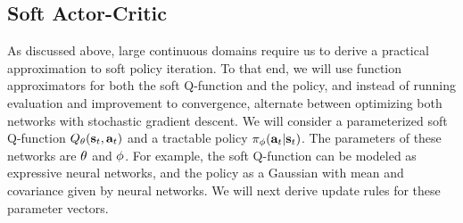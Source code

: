 \subsection{Soft Actor-Critic}
As discussed above, large continuous domains require us to derive a practical approximation to soft policy iteration. To that end, we will use function approximators for both the soft Q-function and the policy, and instead of running evaluation and improvement to convergence, alternate between optimizing both networks with stochastic gradient descent.
We will consider a parameterized soft Q-function $Q_\theta({\mathbf{s}_t}, {\mathbf{a}_t})$ and a tractable policy $\pi_{\phi}({\mathbf{a}_t}|{\mathbf{s}_t})$. The parameters of these networks are  $\theta$ and ${\phi}$. For example, the soft Q-function can be modeled as expressive neural networks, and the policy as a Gaussian with mean and covariance given by neural networks. We will next derive update rules for these parameter vectors.

